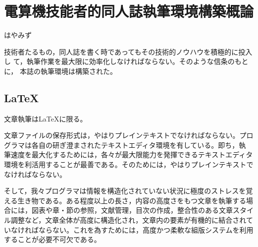 
\chapter{電算機技能者的同人誌執筆環境構築概論}

\begin{flushright}
 はやみず
\end{flushright}

\lettrine{技}
術者たるもの，同人誌を書く時であってもその技術的ノウハウを積極的に投入し
て，執筆作業を最大限に効率化しなければならない。そのような信条のもとに，
本誌の執筆環境は構築された。

% 

\section{LaTeX}

文章執筆はLaTeXに限る。


文章ファイルの保存形式は，やはりプレインテキストでなければならない。プロ
グラマは各自の研ぎ澄まされたテキストエディタ環境を有している。即ち，執
筆速度を最大化するためには，各々が最大限能力を発揮できるテキストエディタ
環境を利活用することが最善である。そのためには，やはりプレインテキストで
なければならない。

そして，我々プログラマは情報を構造化されていない状況に極度のストレスを覚
える生き物である。ある程度以上の長さ，内容の高度さをもつ文章を執筆する場
合には，図表や章・節の参照，文献管理，目次の作成，整合性のある文章スタイ
ル調整など，文章全体が高度に構造化され，文章内の要素が有機的に結合されて
いなければならない。これを為すためには，高度かつ柔軟な組版システムを利用
することが必要不可欠である。

